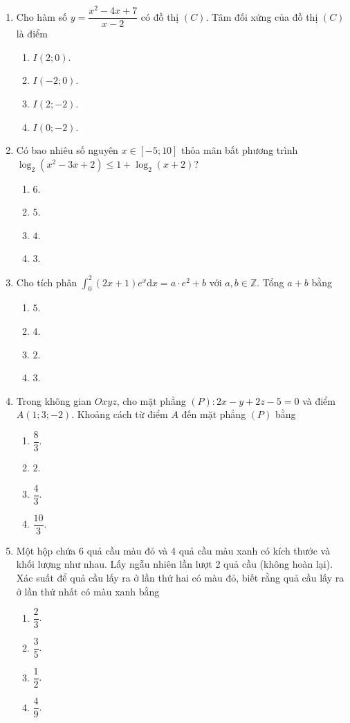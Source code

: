 \documentclass[12pt,a4paper]{article}
\begin{document}
\begin{enumerate}[label=\textbf{Câu \arabic*:}, leftmargin=*]

\item Cho hàm số $y = \dfrac{x^2 - 4x + 7}{x - 2}$ có đồ thị $(C)$. Tâm đối xứng của đồ thị $(C)$ là điểm
\begin{enumerate}[label=\Alph*.]
    \item $I(2; 0)$.
    \item $I(-2; 0)$.
    \item $I(2; -2)$.
    \item $I(0; -2)$.
\end{enumerate}

\item Có bao nhiêu số nguyên $x \in [-5; 10]$ thỏa mãn bất phương trình $\log_2(x^2 - 3x + 2) \le 1 + \log_2(x + 2)$?
\begin{enumerate}[label=\Alph*.]
    \item $6$.
    \item $5$.
    \item $4$.
    \item $3$.
\end{enumerate}

\item Cho tích phân $\displaystyle \int_0^2 (2x + 1) e^x \mathrm{d}x = a \cdot e^2 + b$ với $a, b \in \mathbb{Z}$. Tổng $a + b$ bằng
\begin{enumerate}[label=\Alph*.]
    \item $5$.
    \item $4$.
    \item $2$.
    \item $3$.
\end{enumerate}

\item Trong không gian $Oxyz$, cho mặt phẳng $(P): 2x - y + 2z - 5 = 0$ và điểm $A(1; 3; -2)$. Khoảng cách từ điểm $A$ đến mặt phẳng $(P)$ bằng
\begin{enumerate}[label=\Alph*.]
    \item $\dfrac{8}{3}$.
    \item $2$.
    \item $\dfrac{4}{3}$.
    \item $\dfrac{10}{3}$.
\end{enumerate}

\item Một hộp chứa 6 quả cầu màu đỏ và 4 quả cầu màu xanh có kích thước và khối lượng như nhau. Lấy ngẫu nhiên lần lượt 2 quả cầu (không hoàn lại). Xác suất để quả cầu lấy ra ở lần thứ hai có màu đỏ, biết rằng quả cầu lấy ra ở lần thứ nhất có màu xanh bằng
\begin{enumerate}[label=\Alph*.]
    \item $\dfrac{2}{3}$.
    \item $\dfrac{3}{5}$.
    \item $\dfrac{1}{2}$.
    \item $\dfrac{4}{9}$.
\end{enumerate}


\end{enumerate}
\end{document}
